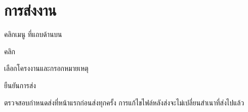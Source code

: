 \section{การส่งงาน}
\label{sec:submit}

\begin{steps}
  \item คลิกเมนู  ที่แถบด้านบน
  \item คลิก 
  \item เลือกโครงงานและกรอกหมายเหตุ
  \item ยืนยันการส่ง
\end{steps}

\begin{important}
ตรวจสอบกำหนดส่งที่หน้าแรกก่อนส่งทุกครั้ง การแก้ไขไฟล์หลังส่งจะไม่เปลี่ยนสำเนาที่ส่งไปแล้ว
\end{important}
